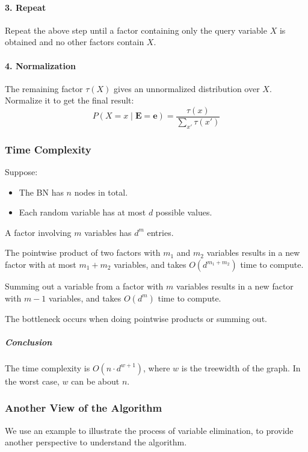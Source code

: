 \documentclass[10pt,UTF8]{article}
\theoremstyle{definition}
\newtheorem{definition inner}{Definition}[section]
\theoremstyle{definition}
\newtheorem{theorem inner}{Theorem}[section]
\theoremstyle{definition}
\newtheorem*{proof inner}{\textit{Proof}}
\theoremstyle{plain}
\newtheorem{tip inner}{Tip}[section]
\theoremstyle{remark}
\begin{document}
\paragraph*{3. Repeat}
Repeat the above step until a factor containing only the query variable \(X\)
is obtained and no other factors contain \(X\).

\paragraph*{4. Normalization}
The remaining factor \(\tau(X)\) gives an unnormalized distribution
over \(X\).
Normalize it to get the final result:
\[
  P(X=x \mid \bm{E}=\bm{e}) = \frac{\tau(x)}{\sum_{x'} \tau(x')}
\]

\subsubsection{Time Complexity}

Suppose:
\begin{itemize}
  \item The BN has \(n\) nodes in total.
  \item Each random variable has at most \(d\) possible values.
\end{itemize}

A factor involving \(m\) variables has \(d^m\) entries.

The pointwise product of two factors with \(m_1\) and \(m_2\)
variables results in a new factor with at most
\(m_1 + m_2\) variables,
and takes \(O(d^{m_1 + m_2})\) time to compute.

Summing out a variable from a factor with \(m\) variables
results in a new factor with \(m-1\) variables,
and takes \(O(d^m)\) time to compute.

The bottleneck occurs when doing pointwise products or summing out.

\subparagraph*{Conclusion}
The time complexity is \(O(n\cdot d^{w+1})\),
where \(w\) is the treewidth of the graph.
In the worst case, \(w\) can be about \(n\).

\subsubsection{Another View of the Algorithm}

We use an example to illustrate the process of variable elimination,
to provide another perspective to understand the algorithm.
\end{document}
